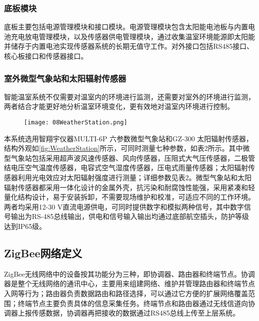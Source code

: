 		\subsubsection{底板模块}
		底板主要包括电源管理模块和接口模块。电源管理模块包含太阳能电池板与内置电池充电放电管理模块，以及传感器供电管理模块，通过收集温室环境能源即太阳能并储存于内置电池实现传感器系统的长期无值守工作。对外接口包括RS485接口、核心板接口和传感器接口。	
		
		\subsubsection{室外微型气象站和太阳辐射传感器}
		智能温室系统不仅需要对温室内的环境进行监测，还需要对室外的环境进行监测，两者结合才能更好地分析温室环境变化，更有效地对温室内环境进行控制。
  		\begin{figure}[!htp]
  			\centering
 			\texttt{[image: 08WeatherStation.png]}
		\end{figure}
		本系统选用智翔宇仪器MULTI-6P 六参数微型气象站和GZ-300 太阳辐射传感器，结构外观如\ref{fig:WeatherStation}所示，可同时测量七种参数，如表2所示。其中微型气象站包括采用超声波风速传感器、风向传感器，压阻式大气压传感器，二极管结电压空气温度传感器，电容式空气湿度传感器，压电式雨量传感器；太阳辐射传感器利用光电效应对太阳辐射强度进行测量；详细参数见表2。微型气象站和太阳辐射传感器都采用一体化设计的金属外壳，抗污染和耐腐蚀性能强，采用紧凑和轻量化结构设计，易于安装拆卸，不需要现场维护和校准，可适应不同的工作环境。两者均采用12-30 V直流电源供电，可同时提供数字和模拟两种信号，其中数字信号输出为RS-485总线输出，供电和信号输入输出均通过底部航空插头，防护等级达到IP65级。

	\subsection{ZigBee网络定义}
	ZigBee无线网络中的设备按其功能分为三种，即协调器、路由器和终端节点。协调器是整个无线网络的通讯中心，主要用来组建网络、维护并管理路由器和终端节点入网等行为；路由器负责数据路由和路径选择，可以通过它方便的扩展网络覆盖范围；终端节点主要负责具体的信息采集任务。终端节点和路由器通过无线信道向协调器上报传感数据，协调器再把接收的数据通过RS485总线上传至上层系统。
	
